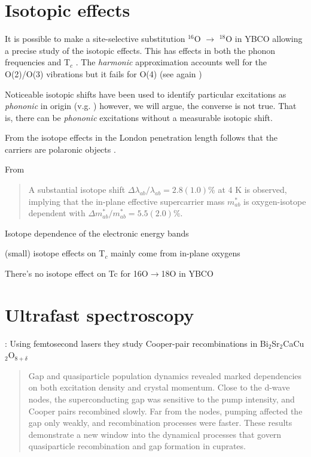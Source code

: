 \section{Isotopic effects}
\label{sec:isotopic_effects}

It is possible to make a site-selective substitution $^{16}$O $\rightarrow$ $^{18}$O in YBCO \cite{Conder1993} allowing a precise study of the isotopic effects. 
This has effects in both the phonon frequencies \cite{Ruani1994} and T$_{c}$ \cite{Zech1994,Cardona1988}. 
The \textit{harmonic} approximation accounts well for the O(2)/O(3) vibrations but it fails for O(4) (see again \cite{Ruani1994})

Noticeable isotopic shifts have been used to identify particular excitations as \textit{phononic} in origin (v.g. \cite{Thomsen1990}) however, we will argue, the converse is not true. 
That is, there can be \textit{phononic} excitations without a measurable isotopic shift.

From the isotope effects in the London penetration length follows that the carriers are polaronic objects \cite{Zhao1997}.

From \cite{Khasanov2004} \begin{quote}A substantial isotope shift $\Delta\lambda_{ab}/\lambda_{ab}=2.8(1.0)$\% at 4 K is observed, implying that the in-plane effective supercarrier mass $m^*_{ab}$ is oxygen-isotope dependent with $\Delta m^*_{ab} / m^*_{ab}=5.5(2.0)$\%.\end{quote}

Isotope dependence of the electronic energy bands \cite{Gweon2004}

(small) isotope effects on T$_c$ mainly come from in-plane oxygens \cite{Zech1994}

There's no isotope effect on Tc for 16O$\rightarrow$18O in YBCO \cite{Thomsen1988}

\section{Ultrafast spectroscopy}
\label{sec:ultrafast_spect}

\cite{Smallwood2012}: Using femtosecond lasers they study Cooper-pair recombinations in Bi$_2$Sr$_2$CaCu$_2$O$_{8+\delta}$
\begin{quote}Gap and quasiparticle population dynamics revealed marked dependencies on both excitation density and crystal momentum. Close to the d-wave nodes, the superconducting gap was sensitive to the pump intensity, and Cooper pairs recombined slowly. Far from the nodes, pumping affected the gap only weakly, and recombination processes were faster. These results demonstrate a new window into the dynamical processes that govern quasiparticle recombination and gap formation in cuprates.\end{quote}

